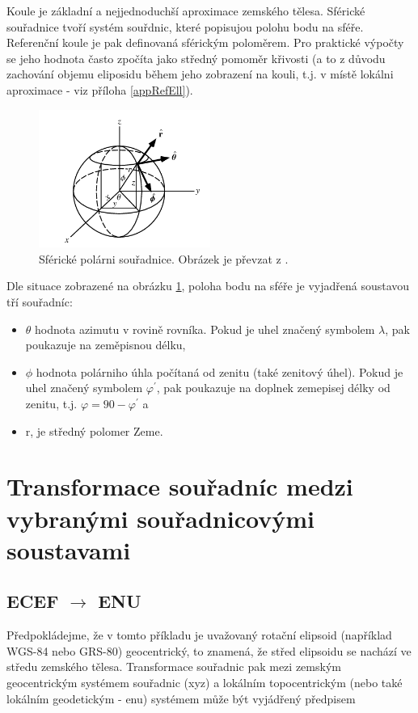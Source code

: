 \documentclass[11pt,a4paper]{article}
\begin{document}
Koule je základní a nejjednoduchší aproximace zemského tělesa. Sférické souřadnice tvoří systém souřdnic, které popisujou polohu bodu na sféře. Referenční koule je pak definovaná sférickým poloměrem. Pro praktické výpočty se jeho hodnota často zpočíta jako středný pomoměr křivosti (a to z důvodu zachování objemu eliposidu během jeho zobrazení na kouli, t.j. v místě lokálni aproximace - viz příloha \ref{appRefEll}).
 
\begin{figure}[ht!]
\begin{center}
\includegraphics[width=0.50\textwidth]{FIG/sphere_wolf}
\caption{Sférické polárni souřadnice. Obrázek je převzat z \cite{sphereWolf}.}
\label{fig:sphere}
\end{center}
\end{figure}

Dle situace zobrazené na obrázku \ref{fig:sphere}, poloha bodu na sféře je vyjadřená soustavou tří souřadníc:
\begin{itemize}
\item $\theta$ hodnota azimutu v rovině rovníka. Pokud je uhel značený symbolem $\lambda$, pak poukazuje na zeměpisnou délku,
\item $\phi$ hodnota polárniho úhla počítaná od zenitu (také zenitový úhel). Pokud je uhel značený symbolem $\varphi^{'}$, pak poukazuje na doplnek zemepisej délky od zenitu, t.j. $\varphi = 90 - \varphi^{'}$ a
\item r, je středný polomer Zeme.
\end{itemize}

\section{Transformace souřadníc medzi vybranými souřadnicovými soustavami}

\subsection{ECEF $\rightarrow$ ENU}
Předpokládejme, že v tomto příkladu je uvažovaný rotační elipsoid (například WGS-84 nebo GRS-80) geocentrický, to znamená, že střed elipsoidu se nachází ve středu zemského tělesa. Transformace souřadnic pak mezi zemským geocentrickým systémem souřadnic (xyz) a lokálním topocentrickým (nebo také lokálním geodetickým - enu) systémem může být vyjádřený předpisem \cite{Soler1998}
\end{document}
